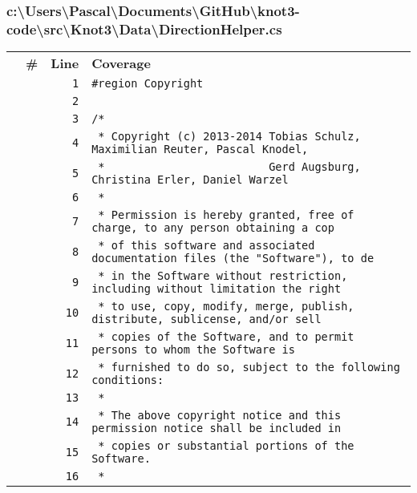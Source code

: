 \documentclass[a4paper,10pt]{article}
\begin{document}
\subsubsection{c:\textbackslash Users\textbackslash Pascal\textbackslash Documents\textbackslash GitHub\textbackslash knot3-code\textbackslash src\textbackslash Knot3\textbackslash Data\textbackslash DirectionHelper.cs}
\begin{longtable}[l]{lrrl}
\textbf{} & \textbf{\#} & \textbf{Line} & \textbf{Coverage}\\
\cellcolor{gray} &  & \verb~1~ & \verb~#region Copyright~\\
\cellcolor{gray} &  & \verb~2~ & \verb~~\\
\cellcolor{gray} &  & \verb~3~ & \verb~/*~\\
\cellcolor{gray} &  & \verb~4~ & \verb~ * Copyright (c) 2013-2014 Tobias Schulz, Maximilian Reuter, Pascal Knodel,~\\
\cellcolor{gray} &  & \verb~5~ & \verb~ *                         Gerd Augsburg, Christina Erler, Daniel Warzel~\\
\cellcolor{gray} &  & \verb~6~ & \verb~ *~\\
\cellcolor{gray} &  & \verb~7~ & \verb~ * Permission is hereby granted, free of charge, to any person obtaining a cop~\\
\cellcolor{gray} &  & \verb~8~ & \verb~ * of this software and associated documentation files (the "Software"), to de~\\
\cellcolor{gray} &  & \verb~9~ & \verb~ * in the Software without restriction, including without limitation the right~\\
\cellcolor{gray} &  & \verb~10~ & \verb~ * to use, copy, modify, merge, publish, distribute, sublicense, and/or sell~\\
\cellcolor{gray} &  & \verb~11~ & \verb~ * copies of the Software, and to permit persons to whom the Software is~\\
\cellcolor{gray} &  & \verb~12~ & \verb~ * furnished to do so, subject to the following conditions:~\\
\cellcolor{gray} &  & \verb~13~ & \verb~ *~\\
\cellcolor{gray} &  & \verb~14~ & \verb~ * The above copyright notice and this permission notice shall be included in ~\\
\cellcolor{gray} &  & \verb~15~ & \verb~ * copies or substantial portions of the Software.~\\
\cellcolor{gray} &  & \verb~16~ & \verb~ *~\\

\end{longtable}
\end{document}
